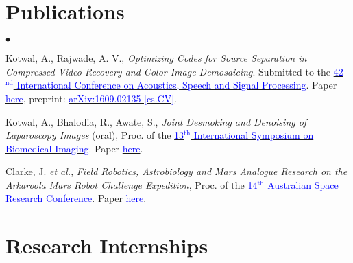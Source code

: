 \documentclass[margin,line]{res}
\newenvironment{list2}{
  \begin{list}{$\bullet$}{%
      \setlength{\itemsep}{0in}
      \setlength{\parsep}{0in} \setlength{\parskip}{0in}
      \setlength{\topsep}{0in} \setlength{\partopsep}{0in} 
      \setlength{\leftmargin}{0.18in}}}{\end{list}}
\begin{document}
\begin{resume}
\vspace*{-0.13in}

\section{\sc Publications}
\begin{list2}
\item Kotwal, A., Rajwade, A. V., {\em Optimizing Codes for Source Separation in Compressed Video Recovery and Color Image Demosaicing}. Submitted to the \href{http://www.ieee-icassp2017.org/}{\textcolor{blue} {42$^\text{nd}$ International Conference on Acoustics, Speech and Signal Processing}}. Paper \href{http://alankarkotwal.github.io/pubs/icassp17.pdf}{\textcolor{blue} {here}}, preprint: \href{https://arxiv.org/abs/1609.02135}{\textcolor{blue} {arXiv:1609.02135 [cs.CV]}}.
\item Kotwal, A., Bhalodia, R., Awate, S., {\em Joint Desmoking and Denoising of Laparoscopy Images} (oral), Proc. of the \href{http://biomedicalimaging.org/2016/}{\textcolor{blue} {13$^\text{th}$ International Symposium on Biomedical Imaging}}. Paper \href{http://alankarkotwal.github.io/pubs/isbi16.pdf}{\textcolor{blue} {here}}.
\item Clarke, J. {\em et al.}, {\em Field Robotics, Astrobiology and Mars Analogue Research on the Arkaroola Mars Robot Challenge Expedition}, Proc. of the \href{http://www.nssa.com.au/14asrc/14ASRC-proceedings.zip}{\textcolor{blue} {14$^\text{th}$ Australian Space Research Conference}}. Paper \href{http://alankarkotwal.github.io/pubs/asrc14.pdf}{\textcolor{blue} {here}}.
\end{list2}

\vspace*{-0.13in}

\section{\sc Research Internships} 


\end{resume}
\end{document}
